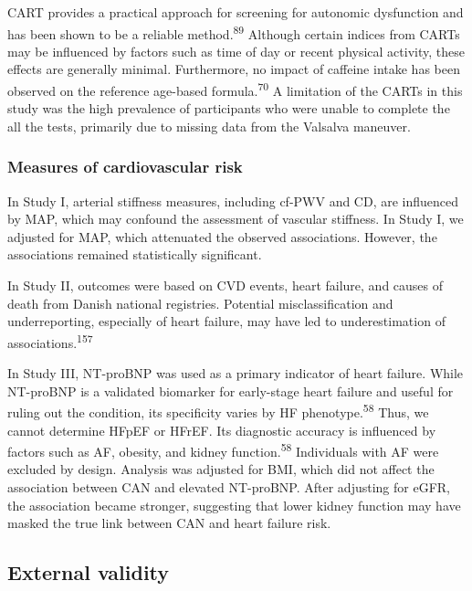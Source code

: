 \documentclass[
  letterpaper,
  headsepline=true,
  open=any]{scrbook}
\begin{document}
CART provides a practical approach for screening for autonomic
dysfunction and has been shown to be a reliable
method.\textsuperscript{89} Although certain indices from CARTs may be
influenced by factors such as time of day or recent physical activity,
these effects are generally minimal. Furthermore, no impact of caffeine
intake has been observed on the reference age-based
formula.\textsuperscript{70} A limitation of the CARTs in this study was
the high prevalence of participants who were unable to complete the all
the tests, primarily due to missing data from the Valsalva maneuver.

\hypertarget{measures-of-cardiovascular-risk}{%
\subsubsection{Measures of cardiovascular
risk}\label{measures-of-cardiovascular-risk}}

In Study I, arterial stiffness measures, including cf-PWV and CD, are
influenced by MAP, which may confound the assessment of vascular
stiffness. In Study I, we adjusted for MAP, which attenuated the
observed associations. However, the associations remained statistically
significant.

In Study II, outcomes were based on CVD events, heart failure, and
causes of death from Danish national registries. Potential
misclassification and underreporting, especially of heart failure, may
have led to underestimation of associations.\textsuperscript{157}

In Study III, NT-proBNP was used as a primary indicator of heart
failure. While NT-proBNP is a validated biomarker for early-stage heart
failure and useful for ruling out the condition, its specificity varies
by HF phenotype.\textsuperscript{58} Thus, we cannot determine HFpEF or
HFrEF. Its diagnostic accuracy is influenced by factors such as AF,
obesity, and kidney function.\textsuperscript{58} Individuals with AF
were excluded by design. Analysis was adjusted for BMI, which did not
affect the association between CAN and elevated NT-proBNP. After
adjusting for eGFR, the association became stronger, suggesting that
lower kidney function may have masked the true link between CAN and
heart failure risk.

\hypertarget{external-validity}{%
\subsection{External validity}\label{external-validity}}
\end{document}
